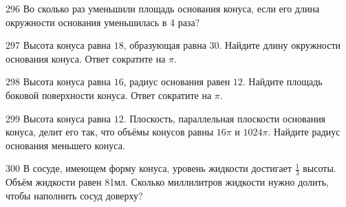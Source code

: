 \documentclass[a4paper]{article}
\begin{document}
\begin{taskBN}{296}
Во сколько раз уменьшили площадь основания конуса, если его длина окружности основания уменьшилась в 4 раза?
\end{taskBN}

\begin{taskBN}{297}
Высота конуса равна $18$, образующая равна $30$. Найдите длину окружности основания конуса. Ответ сократите на $\pi$.
\end{taskBN}

\begin{taskBN}{298}
Высота конуса равна $16$, радиус основания равен $12$. Найдите площадь боковой поверхности конуса. Ответ сократите на $\pi$.
\end{taskBN}

\begin{taskBN}{299}
Высота конуса равна $12$. Плоскость, параллельная плоскости основания конуса,  делит его так, что объёмы конусов равны $16\pi$ и $1024\pi$. Найдите радиус основания меньшего конуса. 
\end{taskBN}

\begin{taskBN}{300}
В сосуде, имеющем форму конуса, уровень жидкости достигает $\frac{1}{3}$ высоты. Объём жидкости равен 81мл. Сколько миллилитров жидкости нужно долить, чтобы наполнить сосуд доверху?
\end{taskBN}

\newpage
 
\end{document}
